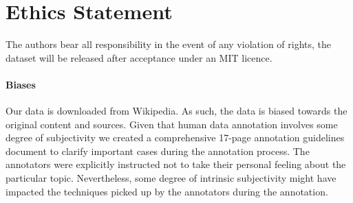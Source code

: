 \documentclass{article}
\begin{document}
\section{Ethics Statement}

The authors bear all responsibility in the event of any violation of rights, the dataset will be released after acceptance under an MIT licence.

\paragraph{Biases}  
Our data is downloaded from Wikipedia. As such, the data is biased towards the original content and sources. Given that human data annotation involves some degree of subjectivity we created a comprehensive 17-page annotation guidelines document to clarify important cases during the annotation process.  The annotators were explicitly instructed not to take their personal feeling about the particular topic. Nevertheless, some degree of intrinsic subjectivity might have impacted the techniques picked up by the annotators during the annotation.











%
\end{document}
